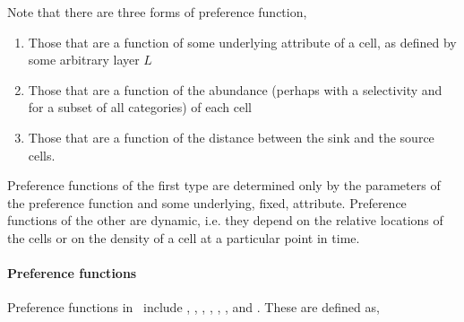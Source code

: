 Note that there are three forms of preference function,
\begin{enumerate}
\item Those that are a function of some underlying attribute of a cell, as defined by some arbitrary layer $L$
\item Those that are a function of the abundance (perhaps with a selectivity and for a subset of all categories) of each cell
\item Those that are a function of the distance between the sink and the source cells. 
\end{enumerate} 

Preference functions of the first type are determined only by the parameters of the preference function and some underlying, fixed, attribute. Preference functions of the other are dynamic, i.e. they depend on the relative locations of the cells or on the density of a cell at a particular point in time.

\paragraph{Preference functions}

Preference functions in \SPM\ include , , , , , , and . These are defined as,

